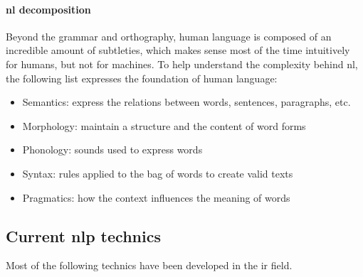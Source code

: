 \paragraph{\gls{nl} decomposition}
Beyond the grammar and orthography, human language is composed of an incredible amount of subtleties, which makes sense most of the time intuitively for humans, but not for machines. To help understand the complexity behind \gls{nl}, the following list expresses the foundation of human language:

\begin{itemize}
    \setlength\itemsep{0em}
    \item Semantics: express the relations between words, sentences, paragraphs, etc.
    \item Morphology: maintain a structure and the content of word forms
    \item Phonology: sounds used to express words
    \item Syntax: rules applied to the bag of words to create valid texts
    \item Pragmatics: how the context influences the meaning of words
\end{itemize}



\subsection{Current \gls{nlp} technics}
Most of the following technics have been developed in the \gls{ir} field.

